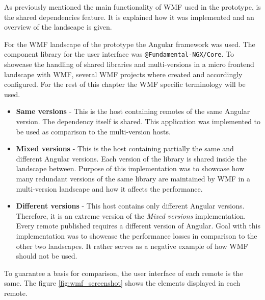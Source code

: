 As previously mentioned the main functionality of WMF used in the prototype, is the shared dependencies feature. It is explained how it was implemented and an overview of the landscape is given.

For the WMF landscape of the prototype the Angular framework was used. The component library for the user interface was \texttt{@Fundamental-NGX/Core}. To showcase the handling of shared libraries and multi-versions in a micro frontend landscape with WMF, several WMF projects where created and accordingly configured.
For the rest of this chapter the WMF specific terminology will be used.

\begin{itemize}
	\item \textbf{Same versions} - This is the host containing remotes of the same Angular version. The dependency itself is shared. This application was implemented to be used as comparison to the multi-version hosts.
	
	\item \textbf{Mixed versions} - This is the host containing partially the same and different Angular versions. Each version of the library is shared inside the landscape between. Purpose of this implementation was to showcase how many redundant versions of the same library are maintained by WMF in a multi-version landscape and how it affects the performance.
	
	\item \textbf{Different versions} - This host contains only different Angular versions. Therefore, it is an extreme version of the \textit{Mixed versions} implementation. Every remote published requires a different version of Angular. Goal with this implementation was to showcase the performance losses in comparison to the other two landscapes. It rather serves as a negative example of how WMF should not be used.
\end{itemize}

To guarantee a basis for comparison, the user interface of each remote is the same. The figure \ref{fig:wmf_screenshot} shows the elements displayed in each remote.

